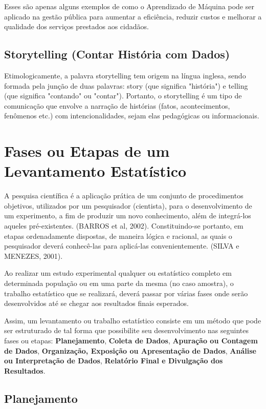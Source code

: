 Esses são apenas alguns exemplos de como o Aprendizado de Máquina pode ser aplicado na gestão pública para aumentar a eficiência, reduzir custos e melhorar a qualidade dos serviços prestados aos cidadãos.

\subsection{Storytelling (Contar História com Dados)}

Etimologicamente, a palavra storytelling tem origem na língua inglesa, sendo formada pela junção de duas palavras: story (que significa "história") e telling (que significa "contando" ou "contar"). Portanto, o storytelling é um tipo de comunicação que envolve a narração de histórias (fatos, acontecimentos, fenômenos etc.) com intencionalidades, sejam elas pedagógicas ou informacionais.

\section{Fases ou Etapas de um Levantamento Estatístico}

A pesquisa científica é a aplicação prática de um conjunto de procedimentos objetivos, utilizados por um pesquisador (cientista), para o desenvolvimento de um experimento, a fim de produzir um novo conhecimento, além de integrá-los aqueles pré-existentes. (BARROS et al, 2002). Constituindo-se portanto, em etapas ordenadamente dispostas, de maneira lógica e racional, as quais o pesquisador deverá conhecê-las para aplicá-las convenientemente. (SILVA e MENEZES, 2001). 
\vskip0.3cm


Ao realizar um estudo experimental qualquer ou estatístico completo em determinada população ou em uma parte da mesma (no caso amostra), o trabalho estatístico que se realizará, deverá passar por várias fases onde serão desenvolvidos até se chegar aos resultados finais esperados.\vskip0.3cm

Assim, um levantamento ou trabalho estatístico consiste em um método que pode ser estruturado de tal forma que possibilite seu desenvolvimento nas se\-guintes fases ou etapas: \textbf{Planejamento}, \textbf{Coleta de Dados}, \textbf{Apuração ou Contagem de Dados}, \textbf{Organização, Exposição ou Apresentação de Dados}, \textbf{Análise ou Interpretação de Dados}, \textbf{Relatório Final e Divulgação dos Resultados}.


\subsection{Planejamento}

